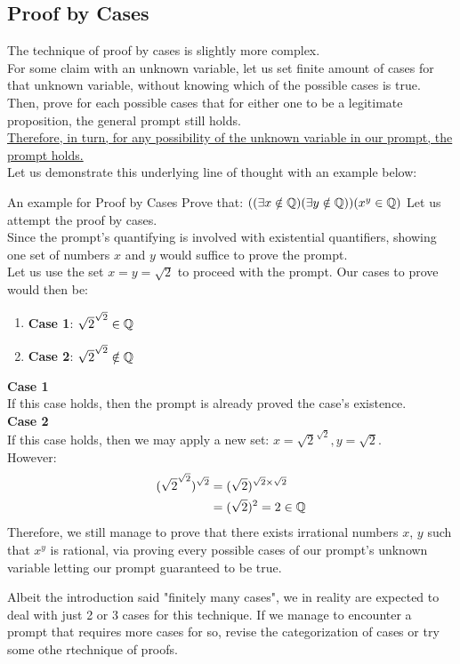 \subsection{Proof by Cases}
The technique of proof by cases is slightly more complex. \\
For some claim with an unknown variable, let us set finite amount of cases for that unknown variable, without knowing which of the possible cases is true. Then, prove for each possible cases that for either one to be a legitimate proposition, the general prompt still holds. \\
\underline{Therefore, in turn, for any possibility of the unknown variable in our prompt, the prompt holds.} \\
Let us demonstrate this underlying line of thought with an example below:
\begin{ln-think}{An example for Proof by Cases}{}
    Prove that: $((\exists x \notin \mathbb{Q})(\exists y \notin \mathbb{Q}))(x^y \in \mathbb{Q})$
    \tcblower
    Let us attempt the proof by cases. \\
    Since the prompt's quantifying is involved with existential quantifiers, showing one set of numbers $x$ and $y$ would suffice to prove the prompt. \\
    Let us use the set $x = y = \sqrt{2}$ to proceed with the prompt. Our cases to prove would then be:
    \begin{enumerate}
        \item \textbf{Case 1}: $\sqrt{2} ^ {\sqrt{2}} \in \mathbb{Q}$
        \item \textbf{Case 2}: $\sqrt{2} ^ {\sqrt{2}} \notin \mathbb{Q}$
    \end{enumerate}
    \textbf{Case 1} \\
    If this case holds, then the prompt is already proved the case's existence. \\
    \textbf{Case 2} \\
    If this case holds, then we may apply a new set: $x = \sqrt{2} ^ {\sqrt{2}}, y = \sqrt{2}$. \\
    However:
    \begin{align*}
        (\sqrt{2} ^ {\sqrt{2}}) ^ {\sqrt{2}}
        &= (\sqrt{2}) ^ {\sqrt{2} \times {\sqrt{2}}} \\
        &= (\sqrt{2}) ^ 2 = 2 \in \mathbb{Q}
    \end{align*}
    Therefore, we still manage to prove that there exists irrational numbers $x$, $y$ such that $x^y$ is rational, via proving every possible cases of our prompt's unknown variable letting our prompt guaranteed to be true.
\end{ln-think}
Albeit the introduction said "finitely many cases", we in reality are expected to deal with just 2 or 3 cases for this technique. If we manage to encounter a prompt that requires more cases for so, revise the categorization of cases or try some othe rtechnique of proofs.


